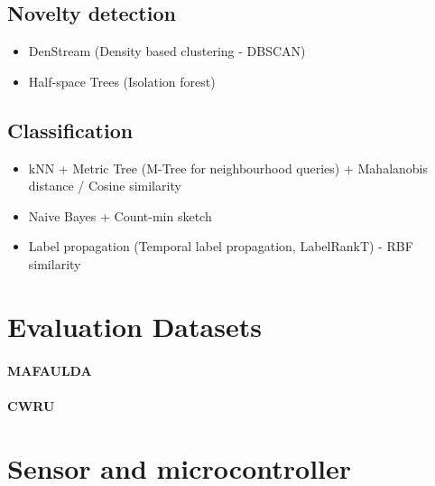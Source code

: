 \subsection{Novelty detection}
\begin{itemize}
\item DenStream (Density based clustering - DBSCAN)
\item Half-space Trees (Isolation forest)
\end{itemize}

\subsection{Classification}
\begin{itemize}
\item kNN + Metric Tree (M-Tree for neighbourhood queries) + Mahalanobis distance / Cosine similarity
\item Naive Bayes + Count-min sketch
\item Label propagation (Temporal label propagation, LabelRankT) - RBF similarity
\end{itemize}


\section{Evaluation Datasets}
\paragraph{MAFAULDA}

\paragraph{CWRU}

\section{Sensor and microcontroller}
